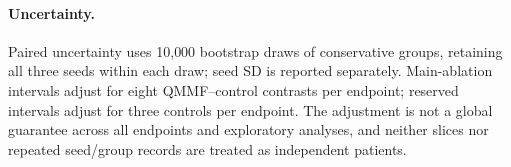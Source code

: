 \paragraph{Uncertainty.}
Paired uncertainty uses 10{,}000 bootstrap draws of conservative groups, retaining all three seeds within each draw; seed SD is reported separately. Main-ablation intervals adjust for eight QMMF--control contrasts per endpoint; reserved intervals adjust for three controls per endpoint. The adjustment is not a global guarantee across all endpoints and exploratory analyses, and neither slices nor repeated seed/group records are treated as independent patients.

